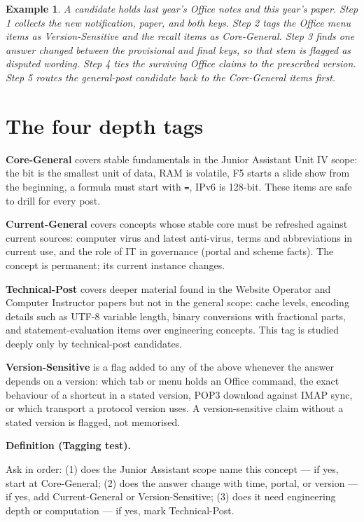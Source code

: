 \documentclass[11pt]{article}
\newtheorem{example}{Example}[section]
\newenvironment{definitionbox}[1]{%
  \par\noindent\textbf{Definition (#1).}\ \itshape
}{\par\vspace{0.3em}}
\begin{document}
\begin{example}
A candidate holds last year's Office notes and this year's paper. Step 1
collects the new notification, paper, and both keys. Step 2 tags the Office
menu items as Version-Sensitive and the recall items as Core-General. Step 3
finds one answer changed between the provisional and final keys, so that stem
is flagged as disputed wording. Step 4 ties the surviving Office claims to the
prescribed version. Step 5 routes the general-post candidate back to the
Core-General items first.
\end{example}

\section{The four depth tags}

\textbf{Core-General} covers stable fundamentals in the Junior Assistant
Unit IV scope: the bit is the smallest unit of data, RAM is volatile, F5
starts a slide show from the beginning, a formula must start with \texttt{=},
IPv6 is 128-bit. These items are safe to drill for every post.

\textbf{Current-General} covers concepts whose stable core must be refreshed
against current sources: computer virus and latest anti-virus, terms and
abbreviations in current use, and the role of IT in governance (portal and
scheme facts). The concept is permanent; its current instance changes.

\textbf{Technical-Post} covers deeper material found in the Website Operator
and Computer Instructor papers but not in the general scope: cache levels,
encoding details such as UTF-8 variable length, binary conversions with
fractional parts, and statement-evaluation items over engineering concepts.
This tag is studied deeply only by technical-post candidates.

\textbf{Version-Sensitive} is a flag added to any of the above whenever the
answer depends on a version: which tab or menu holds an Office command, the
exact behaviour of a shortcut in a stated version, POP3 download against IMAP
sync, or which transport a protocol version uses. A version-sensitive claim
without a stated version is flagged, not memorised.

\begin{definitionbox}{Tagging test}
Ask in order: (1) does the Junior Assistant scope name this concept --- if
yes, start at Core-General; (2) does the answer change with time, portal, or
version --- if yes, add Current-General or Version-Sensitive; (3) does it need
engineering depth or computation --- if yes, mark Technical-Post.
\end{definitionbox}
\end{document}
